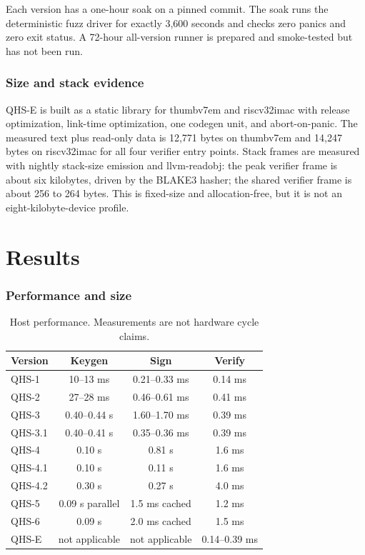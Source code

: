 \documentclass[11pt,a4paper]{article}
\theoremstyle{remark}
\begin{document}
Each version has a one-hour soak on a pinned commit. The soak runs the
deterministic fuzz driver for exactly 3,600 seconds and checks zero panics and
zero exit status. A 72-hour all-version runner is prepared and smoke-tested but
has not been run.

\section{Size and stack evidence}

QHS-E is built as a static library for thumbv7em and riscv32imac with release
optimization, link-time optimization, one codegen unit, and abort-on-panic. The
measured text plus read-only data is 12,771 bytes on thumbv7em and 14,247 bytes
on riscv32imac for all four verifier entry points. Stack frames are measured with
nightly stack-size emission and llvm-readobj: the peak verifier frame is about
six kilobytes, driven by the BLAKE3 hasher; the shared verifier frame is about
256 to 264 bytes. This is fixed-size and allocation-free, but it is not an
eight-kilobyte-device profile.

\part{Results}

\section{Performance and size}

\begin{table}[ht]
\centering
\caption{Host performance. Measurements are not hardware cycle claims.}
\label{tab:performance}
\small
\begin{tabularx}{\textwidth}{@{}l c c c@{}}
\toprule
Version & Keygen & Sign & Verify\\
\midrule
QHS-1 & 10--13 ms & 0.21--0.33 ms & 0.14 ms\\
QHS-2 & 27--28 ms & 0.46--0.61 ms & 0.41 ms\\
QHS-3 & 0.40--0.44 s & 1.60--1.70 ms & 0.39 ms\\
QHS-3.1 & 0.40--0.41 s & 0.35--0.36 ms & 0.39 ms\\
QHS-4 & 0.10 s & 0.81 s & 1.6 ms\\
QHS-4.1 & 0.10 s & 0.11 s & 1.6 ms\\
QHS-4.2 & 0.30 s & 0.27 s & 4.0 ms\\
QHS-5 & 0.09 s parallel & 1.5 ms cached & 1.2 ms\\
QHS-6 & 0.09 s & 2.0 ms cached & 1.5 ms\\
QHS-E & not applicable & not applicable & 0.14--0.39 ms\\
\bottomrule
\end{tabularx}
\end{table}
\end{document}
